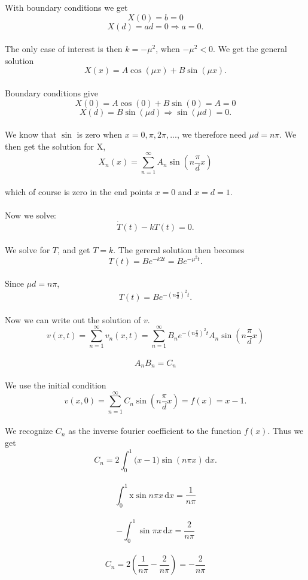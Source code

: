 \documentclass[a4paper,12pt, english]{article}
\begin{document}
With boundary conditions we get
\\
$$X(0) = b = 0$$
$$X(d) = ad = 0 \Rightarrow a = 0.$$
\\
The only case of interest is then $k = -\mu^2$, when $-\mu^2 < 0$. We get the general solution
\\
$$X(x) = A\cos(\mu x) + B\sin(\mu x).$$
\\
Boundary conditions give
\\
$$X(0) = A\cos(0) + B\sin(0) = A = 0$$
$$X(d) = B\sin(\mu d) \Rightarrow \sin(\mu d) = 0.$$
\\
We know that $\sin$ is zero when $x  = 0, \pi, 2\pi,...$, we therefore need $\mu d = n \pi$. We then get the solution for X,
\\
$$X_n(x) = \sum_{n=1}^{\infty} A_n \sin\left(n\frac{\pi}{d} x\right)$$ 
\\
which of course is zero in the end points $x = 0$ and $x = d = 1$.
\\
\\
Now we solve:
\\
$$\dot{T}(t) - kT(t) = 0.$$
\\
We solve for $T$, and get $T = k$. The gereral solution then becomes
\\
$$T(t) = Be^{-k2 t} = Be^{-\mu^2 t}.$$
\\
Since $\mu d = n \pi$,
\\
$$T(t) = Be^{-\left( n \frac{\pi}{d}\right)^2 t}.$$
\\
Now we can write out the solution of $v$. 
\\
$$v(x,t) = \sum_{n=1}^{\infty}v_n(x,t) =
\sum_{n=1}^{\infty} B_n e^{-\left( n \frac{\pi}{d}\right)^2 t} A_n \sin\left(n\frac{\pi}{d} x\right)$$
\\
$$A_nB_n = C_n$$
\\
We use the initial condition 
\\
$$v(x,0) = \sum_{n=1}^{\infty} C_n \sin\left(n\frac{\pi}{d} x\right) = f(x) = x -1.$$
\\
We recognize $C_n$ as the inverse fourier coefficient to the function $f(x)$.
Thus we get
\\
$$C_n = 2\int_0^1 \mathrm(x - 1)\sin (n\pi x)\,\mathrm{d}x.$$
\\
$$\int_0^1 \mathrm x \sin n \pi x\,\mathrm{d}x = \frac{1}{n\pi}$$
\\
$$-\int_0^1 \mathrm \sin \pi x\,\mathrm{d}x = \frac{2}{n \pi}$$
\\
$$C_n = 2 \left(\frac{1}{n\pi} - \frac{2}{n\pi} \right) = -\frac{2}{n\pi}$$
\\
\end{document}
